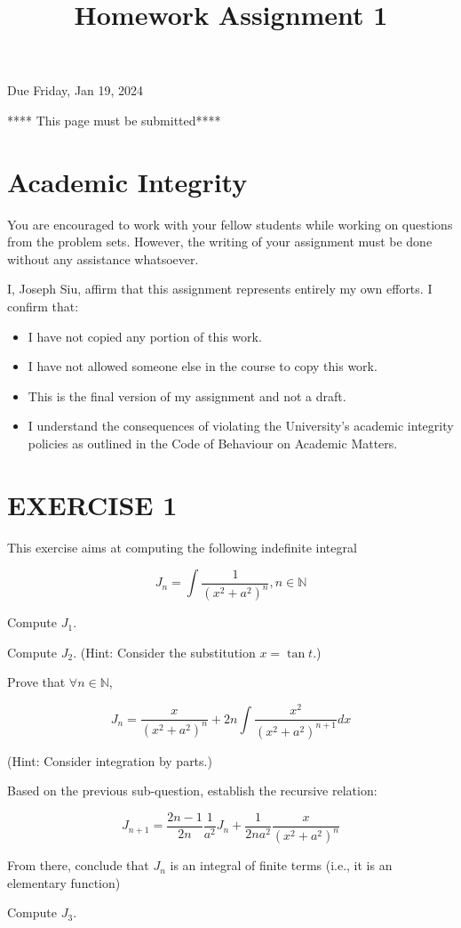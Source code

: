 \documentclass[10pt]{article}
\title{Homework Assignment 1 }
\author{}
\date{}
\begin{document}
\maketitle
Due Friday, Jan 19, 2024

**** This page must be submitted****

\section*{Academic Integrity}
You are encouraged to work with your fellow students while working on questions from the problem sets. However, the writing of your assignment must be done without any assistance whatsoever.

I, Joseph Siu, affirm that this assignment represents entirely my own efforts. I confirm that:

\begin{itemize}
  \item I have not copied any portion of this work.
  \item I have not allowed someone else in the course to copy this work.
  \item This is the final version of my assignment and not a draft.
  \item I understand the consequences of violating the University's academic integrity policies as outlined in the Code of Behaviour on Academic Matters.
\end{itemize}
\newpage
\section*{EXERCISE 1}
This exercise aims at computing the following indefinite integral

$$
J_{n}=\int \frac{1}{\left(x^{2}+a^{2}\right)^{n}}, n \in \mathbb{N}
$$

\question Compute $J_{1}$.

\question Compute $J_{2}$. (Hint: Consider the substitution $x=\tan t$.)

\question Prove that $\forall n \in \mathbb{N}$,

$$
J_{n}=\frac{x}{\left(x^{2}+a^{2}\right)^{n}}+2 n \int \frac{x^{2}}{\left(x^{2}+a^{2}\right)^{n+1}} d x
$$

(Hint: Consider integration by parts.)

\question Based on the previous sub-question, establish the recursive relation:

$$
J_{n+1}=\frac{2 n-1}{2 n} \frac{1}{a^{2}} J_{n}+\frac{1}{2 n a^{2}} \frac{x}{\left(x^{2}+a^{2}\right)^{n}}
$$

From there, conclude that $J_{n}$ is an integral of finite terms (i.e., it is an elementary function) 

\question Compute $J_{3}$.
\end{document}

